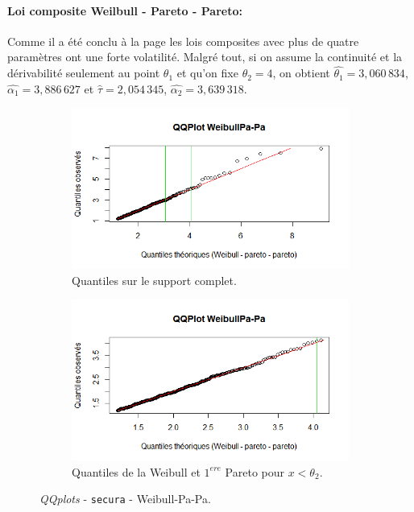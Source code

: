 		\paragraph{Loi composite Weilbull - Pareto - Pareto:} Comme il a été conclu à la page \pageref{QQplot_Cox_Pa_con_3} les lois composites avec plus de quatre paramètres ont une forte volatilité. Malgré tout, si on assume la continuité et la dérivabilité seulement au point $\theta_1$ et qu'on fixe $\theta_2 = 4 $, on obtient $\hat{\theta_1} =3,060\,834$, $\hat{\alpha_1} =  3,886\,627$ et $\hat{\tau}= 2,054\,345$, $\hat{\alpha_2}=3,639\,318$. 
		
		\begin{figure}[H]
			\begin{center}
				\begin{subfigure}[b]{0.45\textwidth}
					\includegraphics[scale=0.55]{Graphiques/QQ_Wei_Pa_Pa_semi_secura} 
					\caption{Quantiles sur le support complet.} \label{QQplot_Wei_PaPa_semi_secura}
				\end{subfigure}
				\begin{subfigure}[b]{0.4\textwidth}
					\includegraphics[scale=0.55]{Graphiques/QQ_Wei_Pa_Pa_semi_t1_secura} 
					\caption{Quantiles de la Weibull et $1^{ere}$ Pareto pour $x<\theta_2$.} \label{QQplot_Wei_PaPa_semi_t1_secura}
				\end{subfigure}
				\renewcommand{\figurename}{Illustration}
				\caption{\textit{QQplots} - \texttt{secura} - Weibull-Pa-Pa.}
			\end{center}
		\end{figure}
	
